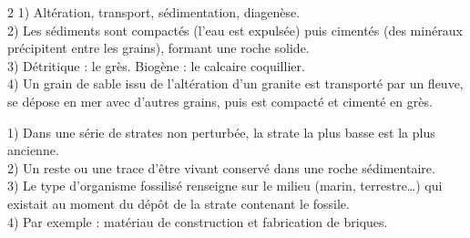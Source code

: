 \begin{multicols}{2}
1) Altération, transport, sédimentation, diagenèse.\\
2) Les sédiments sont compactés (l'eau est expulsée) puis cimentés (des minéraux
précipitent entre les grains), formant une roche solide.\\
3) Détritique : le grès. Biogène : le calcaire coquillier.\\
4) Un grain de sable issu de l'altération d'un granite est transporté par un fleuve,
se dépose en mer avec d'autres grains, puis est compacté et cimenté en grès.

1) Dans une série de strates non perturbée, la strate la plus basse est la plus
ancienne.\\
2) Un reste ou une trace d'être vivant conservé dans une roche sédimentaire.\\
3) Le type d'organisme fossilisé renseigne sur le milieu (marin, terrestre\dots) qui
existait au moment du dépôt de la strate contenant le fossile.\\
4) Par exemple : matériau de construction et fabrication de briques.

\end{multicols}
\exercicesBanner
